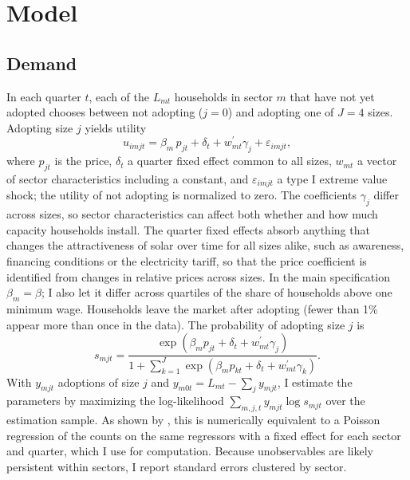 \documentclass[final,3p,times,authoryear]{elsarticle}
\begin{document}
\section{Model}
\label{Model}

\subsection{Demand}

    In each quarter $t$, each of the $L_{mt}$ households in sector $m$ that have not yet adopted chooses between not adopting ($j=0$) and adopting one of $J=4$ sizes. Adopting size $j$ yields utility
    \begin{equation}
        u_{imjt} = \beta_m\, p_{jt} + \delta_t + w_{mt}^{\prime} \gamma_{j} + \varepsilon_{imjt},
        \label{eq:utility}
    \end{equation}
    where $p_{jt}$ is the price, $\delta_t$ a quarter fixed effect common to all sizes, $w_{mt}$ a vector of sector characteristics including a constant, and $\varepsilon_{imjt}$ a type I extreme value shock; the utility of not adopting is normalized to zero. The coefficients $\gamma_j$ differ across sizes, so sector characteristics can affect both whether and how much capacity households install. The quarter fixed effects absorb anything that changes the attractiveness of solar over time for all sizes alike, such as awareness, financing conditions or the electricity tariff, so that the price coefficient is identified from changes in relative prices across sizes. In the main specification $\beta_m = \beta$; I also let it differ across quartiles of the share of households above one minimum wage. Households leave the market after adopting (fewer than 1\% appear more than once in the data). The probability of adopting size $j$ is
    \begin{equation}
        s_{mjt} = \frac{\exp \left(\beta_m p_{jt} + \delta_t + w_{mt}^{\prime} \gamma_{j}\right)}{1+\sum_{k=1}^{J} \exp \left(\beta_m p_{kt} + \delta_t + w_{mt}^{\prime} \gamma_{k}\right)}.
        \label{eq:ccp}
    \end{equation}
    With $y_{mjt}$ adoptions of size $j$ and $y_{m0t} = L_{mt} - \sum_j y_{mjt}$, I estimate the parameters by maximizing the log-likelihood $\sum_{m,j,t} y_{mjt} \log s_{mjt}$ over the estimation sample. As shown by \citet{baker1994multinomial}, this is numerically equivalent to a Poisson regression of the counts on the same regressors with a fixed effect for each sector and quarter, which I use for computation. Because unobservables are likely persistent within sectors, I report standard errors clustered by sector.
\end{document}
